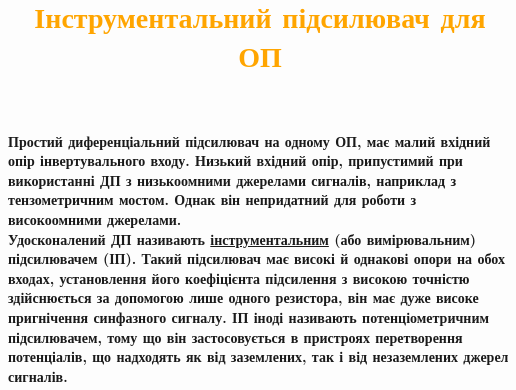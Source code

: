 \documentclass[aspectratio=169]{beamer}
\begin{document}
{
\title{\textcolor{orange}{Інструментальний підсилювач для ОП}}
\begin{frame}
\textbf{Простий диференціальний підсилювач на одному ОП, має малий вхідний опір інвертувального входу. Низький вхідний опір, припустимий при використанні ДП з низькоомними джерелами сигналів, наприклад з тензометричним мостом. Однак він непридатний для роботи з високоомними джерелами.\\
Удосконалений ДП називають \underline{інструментальним} (або вимірювальним) підсилювачем (ІП). Такий підсилювач має високі й однакові опори на обох входах, установлення його коефіцієнта підсилення з високою точністю здійснюється за допомогою лише одного резистора, він має дуже високе пригнічення синфазного сигналу. ІП іноді називають потенціометричним підсилювачем, тому що він застосовується в пристроях перетворення потенціалів, що надходять як від заземлених, так і від незаземлених джерел сигналів.}
\end{frame}
}
\end{document}
